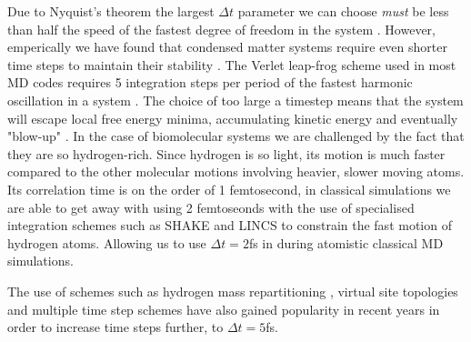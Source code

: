 Due to Nyquist's theorem the largest $\Delta t$ parameter we can choose \textit{must} be less than half the speed of the fastest degree of freedom in the system \cite{shannon1949}. However, emperically we have found that condensed matter systems require even shorter time steps to maintain their stability \cite{leach2009}. The Verlet leap-frog scheme used in most MD codes requires 5 integration steps per period of the fastest harmonic oscillation in a system \cite{mazur1997}\cite{feenstra1999}. The choice of too large a timestep means that the system will escape local free energy minima, accumulating kinetic energy and eventually "blow-up" \cite{braun2019}. In the case of biomolecular systems we are challenged by the fact that they are so hydrogen-rich. Since hydrogen is so light, its motion is much faster compared to the other molecular motions involving heavier, slower moving atoms. Its correlation time is on the order of 1 femtosecond, in classical simulations we are able to get away with using 2 femtoseonds with the use of specialised integration schemes such as SHAKE\cite{andersen1983} and LINCS\cite{hess1997} to constrain the fast motion of hydrogen atoms. Allowing us to use $\Delta t = 2$fs in during atomistic classical MD simulations.

The use of schemes such as hydrogen mass repartitioning \cite{balusek2019}, virtual site topologies \cite{feenstra1999} and multiple time step schemes\cite{streett1978} have also gained popularity in recent years in order to increase time steps further, to $\Delta t = 5$fs. 

